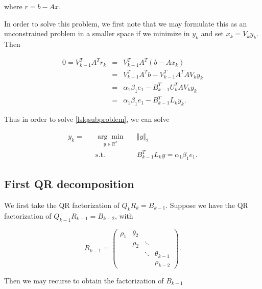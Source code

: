 \documentclass[11pt]{article}
\begin{document}
where $r = b - Ax$.

In order to solve this problem, we first note that we may formulate this as an unconstrained problem in a smaller space if we minimize in $y_k$ and set $x_k = V_k y_k$. Then

\begin{eqnarray*}
0 = V_{k-1}^T A^T r_k &=& V_{k-1}^T A^T (b - Ax_k) \\
&=& V_{k-1}^T A^T b - V_{k-1}^T A^T A V_k y_k \\
&=& \alpha_1 \beta_1 e_1 - B_{k-1}^T U_k^T A V_k y_k \\
&=& \alpha_1 \beta_1 e_1 - B_{k-1}^T L_k y_k.
\end{eqnarray*}

Thus in order to solve \ref{lslqsubproblem}, we can solve

\begin{equation}
\label{lslqsubproblemy}
\begin{aligned}
y_k =&& \underset{y \in \mathbb{R}^k}{\arg\min} && \Vert y \Vert_2 \\
&& \text{s.t.} && B_{k-1}^T L_k y = \alpha_1 \beta_1 e_1.
\end{aligned}
\end{equation}

\subsection{First QR decomposition}
We first take the QR factorization of $Q_k R_k = B_{k-1}$. Suppose we have the QR factorization of $Q_{k-1}R_{k-1} = B_{k-2}$, with

\begin{equation*}
R_{k-1} = \begin{pmatrix}
\rho_1 & \theta_2 & & \\
& \rho_2 & \ddots & \\
& & \ddots & \theta_{k-1} \\
& & & \rho_{k-2}
\end{pmatrix}.
\end{equation*}

Then we may recurse to obtain the factorization of $B_{k-1}$
\end{document}
